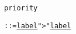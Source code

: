 
\begin{alltt}
\hypertarget{priorityP\newLinkVer}{priority} ::= \hyperlink{labelP\linkVer}{label} ">" \hyperlink{labelP\linkVer}{label}
\end{alltt}
